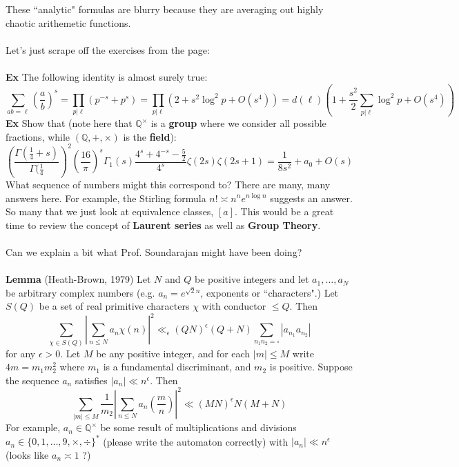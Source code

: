 \documentclass[12pt]{article}
\begin{document}
\newpage

\noindent These ``analytic" formulas are blurry because they are averaging out highly chaotic arithemetic functions.  \\ \\
Let's just scrape off the exercises from the page:\\ \\ 
\textbf{Ex} The following identity is almost surely true:
$$ \sum_{ab= \ell} \left( \frac{a}{b} \right)^s = \prod_{p | \ell} (p^{-s} + p^s) 
= \prod_{p | \ell} (2 + s^2 \log^2 p + O(s^4)) = d(\ell) \left( 1 + \frac{s^2}{2} \sum_{p | \ell} \log^2 p + O(s^4) \right) $$
\textbf{Ex} Show that (note here that $\mathbb{Q}^\times$ is a \textbf{group} where we consider all possible fractions, while $(\mathbb{Q}, + , \times)$ is the \textbf{field}):
$$  \left( \frac{\Gamma( \frac{1}{4}+s)}{\Gamma(\frac{1}{4}} \right)^2 \left( \frac{16}{\pi}\right)^s
\Gamma_1(s) \frac{ 4^s + 4^{-s} - \frac{5}{2}}{4^s}\zeta(2s)\zeta(2s+1) = \frac{1}{8s^2} + a_0 + O(s) $$
What sequence of numbers might this correspond to? There are many, many answers here. For example, the Stirling formula $n! \asymp n^n e^{n \log n}$ suggests an answer.  So many that we just look at equivalence classes, $[a]$.  This would be a great time to review the concept of \textbf{Laurent series} as well as \textbf{Group Theory}. \\ \\
Can we explain a bit what Prof. Soundarajan might have been doing? \\ \\
\textbf{Lemma} (Heath-Brown, 1979) Let $N$ and $Q$ be positive integers and let $a_1, \dots, a_N $ be arbitrary complex numbers (e.g. $a_n = e^{\sqrt{2}n}$, exponents or ``characters".)  Let $S(Q)$ be a set of real primitive characters $\chi$ with conductor $\leq Q$.  Then
$$ \sum_{\chi \in S(Q)} \left| \sum_{n \leq N} a_n \chi(n) \right|^2 \ll_\epsilon (QN)^\epsilon (Q+N) \sum_{n_1 n_2 = \square} |a_{n_1}a_{n_2}| $$
for any $\epsilon > 0$.  Let $M$ be any positive integer, and for each $|m| \leq M $ write $4m = m_1 m_2^2 $ where $m_1 $ is a fundamental discriminant, and $m_2 $ is positive. Suppose the sequence $a_n$ satisfies $|a_n| \ll n^{\epsilon}  $.  Then 
$$ \sum_{|m| \leq M} \frac{1}{m_2} \left| \sum_{n \leq N} a_n \left( \frac{m}{n}\right) \right|^2 \ll (MN)^\epsilon N(M+N) $$
For example, $a_n \in \mathbb{Q}^\times$ be some result of multiplications and divisions $a_n \in \{0, 1, \dots, 9 , \times, \div\}^*$ (please write the automaton correctly) with $|a_n| \ll n^\epsilon$ (looks like $a_n \asymp 1$ ?) \\ \\
\end{document}
